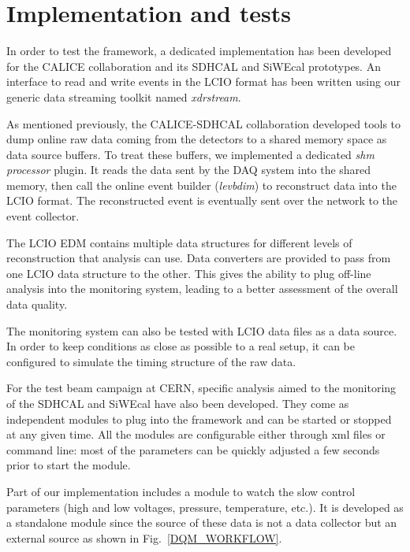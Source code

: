 \documentclass[conference]{IEEEtran}
\begin{document}
\section{Implementation and tests}
In order to test the framework, a dedicated implementation has been developed for the CALICE collaboration and its SDHCAL and SiWEcal prototypes.
An interface to read and write events in the LCIO format has been written using our generic data streaming toolkit named \textit{xdrstream}.


As mentioned previously, the CALICE-SDHCAL collaboration developed tools to dump online raw data coming from the detectors to a shared memory space as data source buffers. To treat these buffers, we implemented a dedicated \textit{shm processor} plugin. It reads the data sent by the DAQ system into the shared memory, then call the online event builder (\textit{levbdim}) to reconstruct data into the LCIO format. The reconstructed event is eventually sent over the network to the event collector.

The LCIO EDM contains multiple data structures for different levels of reconstruction that analysis can use. Data converters are provided to pass from one LCIO data structure to the other. This gives the ability to plug off-line analysis into the monitoring system, leading to a better assessment of the overall data quality.

The monitoring system can also be tested with LCIO data files as a data source. In order to keep conditions as close as possible to a real setup, it can be configured to simulate the timing structure of the raw data.

For the test beam campaign at CERN, specific analysis aimed to the monitoring of the SDHCAL and SiWEcal have also been developed. They come as independent modules to plug into the framework and can be started or stopped at any given time. All the modules are configurable either through xml files or command line: most of the parameters can be quickly adjusted a few seconds prior to start the module.

Part of our implementation includes a module to watch the slow control parameters (high and low voltages, pressure, temperature, etc.). It is developed as a standalone module since the source of these data is not a data collector but an external source as shown in Fig.~\ref{DQM_WORKFLOW}.
\end{document}
